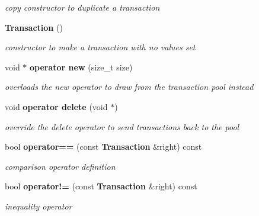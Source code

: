 \begin{DoxyCompactItemize}
\begin{DoxyCompactList}\small\item\em copy constructor to duplicate a transaction \item\end{DoxyCompactList}\item 
{\bf Transaction} ()\label{class_d_r_a_msim_i_i_1_1_transaction_ab47005b855d38bc324bb79fd023baa13}

\begin{DoxyCompactList}\small\item\em constructor to make a transaction with no values set \item\end{DoxyCompactList}\item 
void $\ast$ {\bf operator new} (size\_\-t size)
\begin{DoxyCompactList}\small\item\em overloads the new operator to draw from the transaction pool instead \item\end{DoxyCompactList}\item 
void {\bf operator delete} (void $\ast$)
\begin{DoxyCompactList}\small\item\em override the delete operator to send transactions back to the pool \item\end{DoxyCompactList}\item 
bool {\bf operator==} (const {\bf Transaction} \&right) const \label{class_d_r_a_msim_i_i_1_1_transaction_ab4f7300d5c8d4ef667d7f060c1e148a2}

\begin{DoxyCompactList}\small\item\em comparison operator definition \item\end{DoxyCompactList}\item 
bool {\bf operator!=} (const {\bf Transaction} \&right) const \label{class_d_r_a_msim_i_i_1_1_transaction_a08a3515c210fcd34a4131a2f9c0263c0}

\begin{DoxyCompactList}\small\item\em inequality operator \item\end{DoxyCompactList}\end{DoxyCompactItemize}
